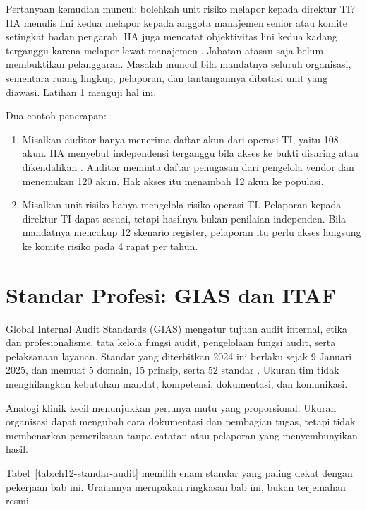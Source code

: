 Pertanyaan kemudian muncul: bolehkah unit risiko melapor kepada direktur TI? IIA menulis lini
kedua melapor kepada anggota manajemen senior atau komite setingkat badan pengarah. IIA juga
mencatat objektivitas lini kedua kadang terganggu karena melapor lewat manajemen
\cite{iia-tlm2026}. Jabatan atasan saja belum membuktikan pelanggaran. Masalah muncul bila
mandatnya seluruh organisasi, sementara ruang lingkup, pelaporan, dan tantangannya dibatasi unit
yang diawasi. Latihan 1 menguji hal ini.

Dua contoh penerapan:
\begin{enumerate}
  \item Misalkan auditor hanya menerima daftar akun dari operasi TI, yaitu 108 akun. IIA menyebut
  independensi terganggu bila akses ke bukti disaring atau dikendalikan \cite{iia-tlm2026}. Auditor
  meminta daftar penugasan dari pengelola vendor dan menemukan 120 akun. Hak akses itu menambah 12
  akun ke populasi.
  \item Misalkan unit risiko hanya mengelola risiko operasi TI. Pelaporan kepada direktur TI dapat
  sesuai, tetapi hasilnya bukan penilaian independen. Bila mandatnya mencakup 12 skenario register,
  pelaporan itu perlu akses langsung ke komite risiko pada 4 rapat per tahun.
\end{enumerate}

\section{Standar Profesi: GIAS dan ITAF}

Global Internal Audit Standards (GIAS) mengatur tujuan audit internal, etika dan profesionalisme,
tata kelola fungsi audit, pengelolaan fungsi audit, serta pelaksanaan layanan. Standar yang
diterbitkan 2024 ini berlaku sejak 9 Januari 2025, dan memuat 5 domain, 15 prinsip, serta 52
standar \cite{iia-gias2024}. Ukuran tim tidak menghilangkan kebutuhan mandat, kompetensi,
dokumentasi, dan komunikasi.

Analogi klinik kecil menunjukkan perlunya mutu yang proporsional. Ukuran organisasi dapat mengubah
cara dokumentasi dan pembagian tugas, tetapi tidak membenarkan pemeriksaan tanpa catatan atau
pelaporan yang menyembunyikan hasil.

Tabel~\ref{tab:ch12-standar-audit} memilih enam standar yang paling dekat dengan pekerjaan bab
ini. Uraiannya merupakan ringkasan bab ini, bukan terjemahan resmi.

